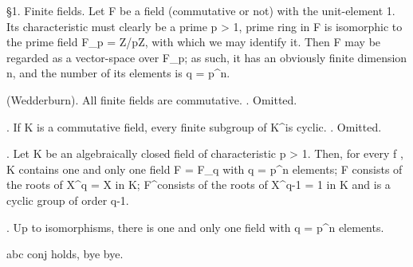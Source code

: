 
  \S 1. Finite fields. Let F be a field (commutative or not) with the
unit-element 1. Its characteristic must clearly be a prime p > 1, 
prime ring in F is isomorphic to the prime field \mathbf F_p = \mathbf Z/p\mathbf Z, with 
which we may identify it. Then F may be regarded as a vector-space over \mathbf F_p;  
as such, it has an obviously finite dimension n, and the number of its 
elements is q = p^n. 

\theorem (Wedderburn). All finite fields are commutative. 
\proof. Omitted.

\lemma. If K is a commutative field, every finite subgroup of K^\times is cyclic.
\proof. Omitted.

\theorem. Let K be an algebraically closed field of characteristic p > 1. 
Then, for every f , K contains one and only one field F = F_q with 
q = p^n elements; F consists of the roots of X^q = X in K; F^\times consists 
of the roots of X^{q-1} = 1 in K and is a cyclic group of order q-1. 

\corollary. Up to isomorphisms, there is one and only one field with q = p^n elements. 

\begin{theorem}
  abc conj holds,
  bye bye.
\end{theorem}

